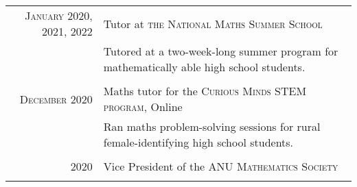 \documentclass[a4paper,10pt]{article} %
\begin{document}
\begin{tabular}{r|p{12cm}}

\textsc{January 2020, 2021, 2022} & Tutor at \textsc{the National Maths Summer School} \emph{}\\
& \footnotesize{Tutored at a two-week-long summer program for mathematically able high school students.}\\
\multicolumn{2}{c}{} \\


\textsc{December 2020} & Maths tutor for the \textsc{Curious Minds STEM program}, Online \emph{}\\
& \footnotesize{Ran maths problem-solving sessions for rural female-identifying high school students.}\\
\multicolumn{2}{c}{} \\


\textsc{2020} & Vice President of the \textsc{ANU Mathematics Society}\\
\multicolumn{2}{c}{} \\



\end{tabular}
\end{document}
